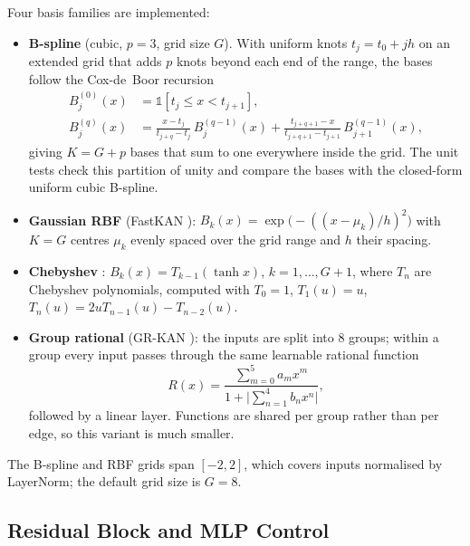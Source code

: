\documentclass[12pt,a4paper]{report}
\begin{document}
Four basis families are implemented:

\begin{itemize}
    \item \textbf{B-spline} (cubic, $p = 3$, grid size $G$). With uniform knots
          $t_j = t_0 + jh$ on an extended grid that adds $p$ knots beyond each end
          of the range, the bases follow the Cox-de~Boor recursion
          \begin{align}
          B^{(0)}_j(x) &= \mathbb{1}[t_j \le x < t_{j+1}], \\
          B^{(q)}_j(x) &= \frac{x - t_j}{t_{j+q} - t_j}\, B^{(q-1)}_j(x)
                       + \frac{t_{j+q+1} - x}{t_{j+q+1} - t_{j+1}}\, B^{(q-1)}_{j+1}(x),
          \end{align}
          giving $K = G + p$ bases that sum to one everywhere inside the grid.
          The unit tests check this partition of unity and compare the bases with
          the closed-form uniform cubic B-spline.
    \item \textbf{Gaussian RBF} (FastKAN \cite{li2024fastkan}):
          $B_k(x) = \exp\!\big(-((x - \mu_k)/h)^2\big)$ with $K = G$ centres
          $\mu_k$ evenly spaced over the grid range and $h$ their spacing.
    \item \textbf{Chebyshev} \cite{ss2024cheby}: $B_k(x) = T_{k-1}(\tanh x)$,
          $k = 1, \ldots, G+1$, where $T_n$ are Chebyshev polynomials,
          computed with $T_0 = 1$, $T_1(u) = u$, $T_{n}(u) = 2uT_{n-1}(u) - T_{n-2}(u)$.
    \item \textbf{Group rational} (GR-KAN \cite{yang2025kat}): the inputs are split
          into 8 groups; within a group every input passes through the same
          learnable rational function
          \begin{equation}
          R(x) = \frac{\sum_{m=0}^{5} a_m x^m}{1 + \big|\sum_{n=1}^{4} b_n x^n\big|},
          \end{equation}
          followed by a linear layer. Functions are shared per group rather than
          per edge, so this variant is much smaller.
\end{itemize}

The B-spline and RBF grids span $[-2, 2]$, which covers inputs normalised by
LayerNorm; the default grid size is $G = 8$.

\subsection{Residual Block and MLP Control}
\end{document}
